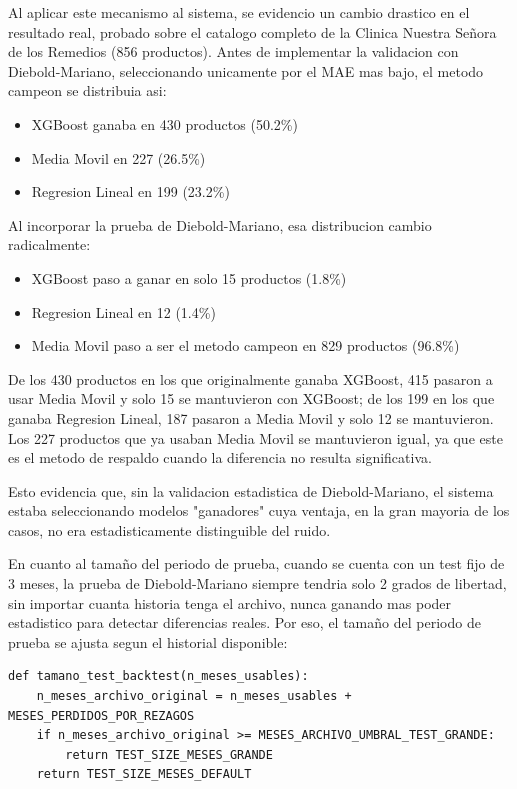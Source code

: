 Al aplicar este mecanismo al sistema, se evidencio un cambio drastico en el resultado real, probado sobre el catalogo completo de la Clinica Nuestra Señora de los Remedios (856 productos). Antes de implementar la validacion con Diebold-Mariano, seleccionando unicamente por el MAE mas bajo, el metodo campeon se distribuia asi:

\begin{itemize}
    \item XGBoost ganaba en 430 productos (50.2\%)
    \item Media Movil en 227 (26.5\%)
    \item Regresion Lineal en 199 (23.2\%)
\end{itemize}

Al incorporar la prueba de Diebold-Mariano, esa distribucion cambio radicalmente: 

\begin{itemize}
    \item XGBoost paso a ganar en solo 15 productos (1.8\%)
    \item Regresion Lineal en 12 (1.4\%)
    \item Media Movil paso a ser el metodo campeon en 829 productos (96.8\%)
\end{itemize}


De los 430 productos en los que originalmente ganaba XGBoost, 415 pasaron a usar Media Movil y solo 15 se mantuvieron con XGBoost; de los 199 en los que ganaba Regresion Lineal, 187 pasaron a Media Movil y solo 12 se mantuvieron. Los 227 productos que ya usaban Media Movil se mantuvieron igual, ya que este es el metodo de respaldo cuando la diferencia no resulta significativa. 

Esto evidencia que, sin la validacion estadistica de Diebold-Mariano, el sistema estaba seleccionando modelos "ganadores" cuya ventaja, en la gran mayoria de los casos, no era estadisticamente distinguible del ruido.

En cuanto al tamaño del periodo de prueba, cuando se cuenta con un test fijo de 3 meses, la prueba de Diebold-Mariano siempre tendria solo 2 grados de libertad, sin importar cuanta historia tenga el archivo, nunca ganando mas poder estadistico para detectar diferencias reales. Por eso, el tamaño del periodo de prueba se ajusta segun el historial disponible:

\label{lst:campeon_tamano_test}
\begin{verbatim}
def tamano_test_backtest(n_meses_usables):
    n_meses_archivo_original = n_meses_usables + MESES_PERDIDOS_POR_REZAGOS
    if n_meses_archivo_original >= MESES_ARCHIVO_UMBRAL_TEST_GRANDE:
        return TEST_SIZE_MESES_GRANDE
    return TEST_SIZE_MESES_DEFAULT
\end{verbatim}

